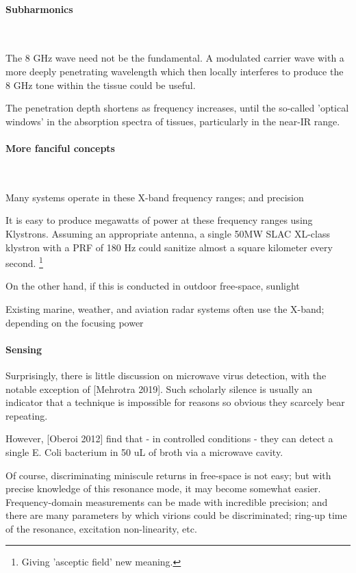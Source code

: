 \documentclass[fleqn,10pt]{article}
\begin{document}
\begin{multicols}{1}
\paragraph{\textbf{Subharmonics}}\

The 8 GHz wave need not be the fundamental. A modulated carrier wave with a more deeply penetrating wavelength which then locally interferes to produce the 8 GHz tone within the tissue could be useful.

The penetration depth shortens as frequency increases, until the so-called 'optical windows' in the absorption spectra of tissues, particularly in the near-IR range. 

\paragraph{\textbf{More fanciful concepts}}\

Many systems operate in these X-band frequency ranges; and precision 

It is easy to produce megawatts of power at these frequency ranges using Klystrons. Assuming an appropriate antenna, a single 50MW SLAC XL-class klystron with a PRF of 180 Hz could sanitize almost a square kilometer every second. \footnote{Giving 'asceptic field' new meaning.}

On the other hand, if this is conducted in outdoor free-space, sunlight

Existing marine, weather, and aviation radar systems often use the X-band; depending on the focusing power

\paragraph{Sensing}

Surprisingly, there is little discussion on microwave virus detection, with the notable exception of [Mehrotra 2019]. Such scholarly silence is usually an indicator that a technique is impossible for reasons so obvious they scarcely bear repeating. 

However, [Oberoi 2012] find that - in controlled conditions - they can detect a single E. Coli bacterium in 50 uL of broth via a microwave cavity. 

Of course, discriminating miniscule returns in free-space is not easy; but with precise knowledge of this resonance mode, it may become somewhat easier. Frequency-domain measurements can be made with incredible precision; and there are many parameters by which virions could be discriminated; ring-up time of the resonance, excitation non-linearity, etc.


\end{multicols}
\end{document}

